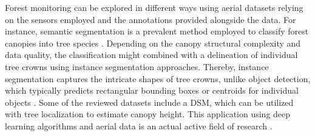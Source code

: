 \documentclass{CUP-JNL-DTM}%
\theoremstyle{definition}
\numberwithin{equation}{section}
\begin{document}
Forest monitoring can be explored in different ways using aerial datasets relying on the sensors employed and the annotations provided alongside the data.
For instance, semantic segmentation is a prevalent method employed to classify forest canopies into tree species \cite{morales_automatic_2018, kattenborn_convolutional_2019, kentsch_computer_2020, schiefer_mapping_2020, kattenborn_convolutional_2020, galuszynski_automated_2022}. Depending on the canopy structural complexity and data quality, the classification might combined with a delineation of individual tree crowns using instance segmentation approaches. Thereby, instance segmentation captures the intricate shapes of tree crowns, unlike object detection, which typically predicts rectangular bounding boxes or centroids for individual objects \cite{reiersen_reforestree_2022}.
Some of the reviewed datasets include a DSM, which can be utilized with tree localization to estimate canopy height. 
This application using deep learning algorithms and aerial data is an actual active field of research \cite{yue_treeunet_2019, moradi_potential_2022, reiersen_reforestree_2022, wagner_sub-meter_2023}.
\end{document}
